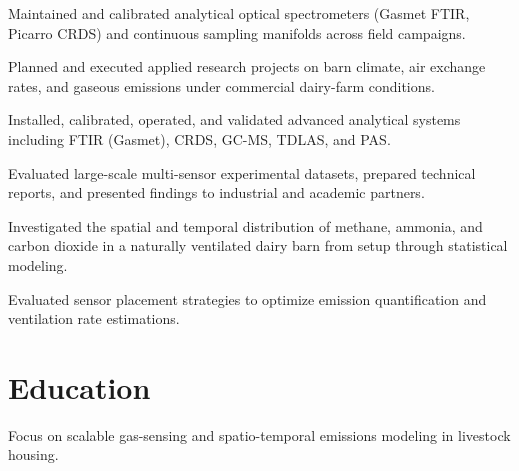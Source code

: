 \documentclass[10pt,a4paper]{article}
\begin{document}
\begin{cvitems}

  \item Maintained and calibrated analytical optical spectrometers (Gasmet FTIR, Picarro CRDS) and continuous sampling manifolds across field campaigns.

  \item Planned and executed applied research projects on barn climate, air exchange rates, and gaseous emissions under commercial dairy-farm conditions.

  \item Installed, calibrated, operated, and validated advanced analytical systems including FTIR (Gasmet), CRDS, GC-MS, TDLAS, and PAS.

  \item Evaluated large-scale multi-sensor experimental datasets, prepared technical reports, and presented findings to industrial and academic partners.

\end{cvitems}
\vspace{2pt}

\begin{cvitems}

  \item Investigated the spatial and temporal distribution of methane, ammonia, and carbon dioxide in a naturally ventilated dairy barn from setup through statistical modeling.

  \item Evaluated sensor placement strategies to optimize emission quantification and ventilation rate estimations.

\end{cvitems}
\vspace{2pt}


\section*{Education}


{\small Focus on scalable gas-sensing and spatio-temporal emissions modeling in livestock housing.}\par
\end{document}
